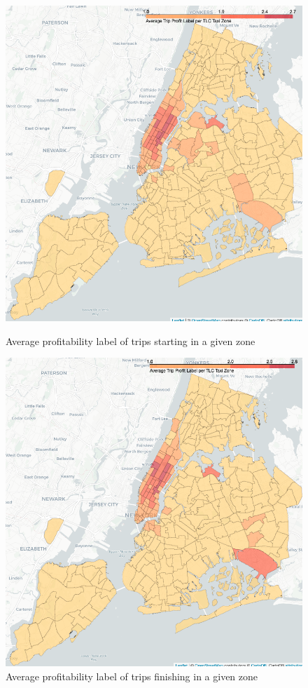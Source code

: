 \documentclass[11pt]{article}
\begin{document}
\begin{figure}[!htb]
\centering
\begin{minipage}[b]{0.45\linewidth}
\includegraphics[scale=0.23]{plots/pu_profit.png}
\caption{Average profitability label of trips starting in a given zone}
\label{fig:minipage1}
\end{minipage}
\quad
\begin{minipage}[b]{0.45\linewidth}
\includegraphics[scale=0.23]{plots/do_profit.png}
\caption{Average profitability label of trips finishing in a given zone}
\label{fig:minipage2}
\end{minipage}
\end{figure}
\end{document}
